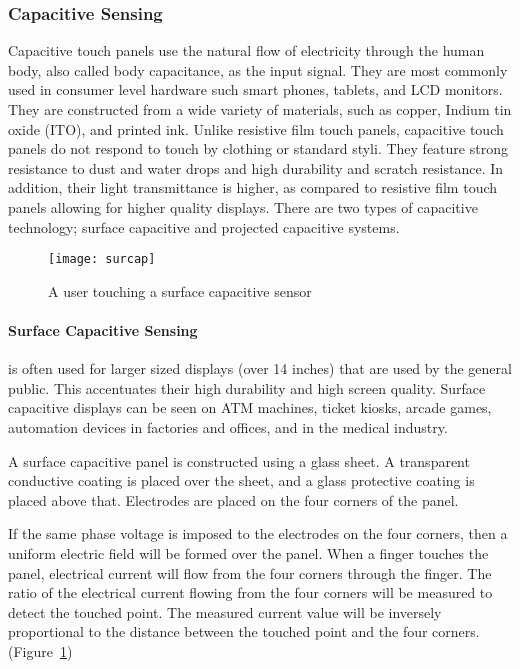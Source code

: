 \subsubsection{Capacitive Sensing}
Capacitive touch panels use the natural flow of electricity through the human body, also called body capacitance, as the input signal.
They are most commonly used in consumer level hardware such smart phones, tablets, and LCD monitors.
They are constructed from a wide variety of materials, such as copper, Indium tin oxide (ITO), and printed ink.
Unlike resistive film touch panels, capacitive touch panels do not respond to touch by clothing or standard styli.
They feature strong resistance to dust and water drops and high durability and scratch resistance. 
In addition, their light transmittance is higher, as compared to resistive film touch panels allowing for higher quality displays.
There are two types of capacitive technology; surface capacitive and projected capacitive systems.
 
\begin{center}
\begin{figure}
\texttt{[image: surcap]}
\caption{A user touching a surface capacitive sensor \cite{touchtech}}
\label{fig:surcap}
\end{figure}
\end{center}

\paragraph{Surface Capacitive Sensing}

is often used for larger sized displays (over 14 inches) that are used by the general public.
This accentuates their high durability and high screen quality.
Surface capacitive displays can be seen on ATM machines, ticket kiosks, arcade games, automation devices in factories and offices, and in the medical industry.

A surface capacitive panel is constructed using a glass sheet. 
A transparent conductive coating is placed over the sheet, and a glass protective coating is placed above that. 
Electrodes are placed on the four corners of the panel. 

If the same phase voltage is imposed to the electrodes on the four corners, then a uniform electric field will be formed over the panel. 
When a finger touches the panel, electrical current will flow from the four corners through the finger. 
The ratio of the electrical current flowing from the four corners will be measured to detect the touched point. 
The measured current value will be inversely proportional to the distance between the touched point and the four corners. (Figure~\ref{fig:surcap})

